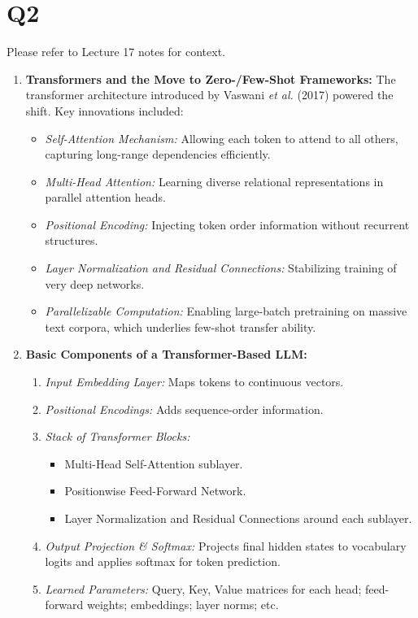 \documentclass[12pt]{article}
\begin{document}
\newpage
\section*{Q2}
Please refer to Lecture 17 notes for context.
\begin{enumerate}
  \item \textbf{Transformers and the Move to Zero-/Few-Shot Frameworks:} 
    The transformer architecture introduced by Vaswani \emph{et al.} (2017) powered the shift.  Key innovations included:
    \begin{itemize}
      \item \emph{Self-Attention Mechanism:} Allowing each token to attend to all others, capturing long-range dependencies efficiently.
      \item \emph{Multi-Head Attention:} Learning diverse relational representations in parallel attention heads.
      \item \emph{Positional Encoding:} Injecting token order information without recurrent structures.
      \item \emph{Layer Normalization and Residual Connections:} Stabilizing training of very deep networks.
      \item \emph{Parallelizable Computation:} Enabling large-batch pretraining on massive text corpora, which underlies few-shot transfer ability.
    \end{itemize}

  \item \textbf{Basic Components of a Transformer-Based LLM:}
    \begin{enumerate}
      \item \emph{Input Embedding Layer:} Maps tokens to continuous vectors.
      \item \emph{Positional Encodings:} Adds sequence-order information.
      \item \emph{Stack of Transformer Blocks:}
        \begin{itemize}
          \item Multi-Head Self-Attention sublayer.
          \item Positionwise Feed-Forward Network.
          \item Layer Normalization and Residual Connections around each sublayer.
        \end{itemize}
      \item \emph{Output Projection \& Softmax:} Projects final hidden states to vocabulary logits and applies softmax for token prediction.
      \item \emph{Learned Parameters:} Query, Key, Value matrices for each head; feed-forward weights; embeddings; layer norms; etc.
    \end{enumerate}


\end{enumerate}
\end{document}
